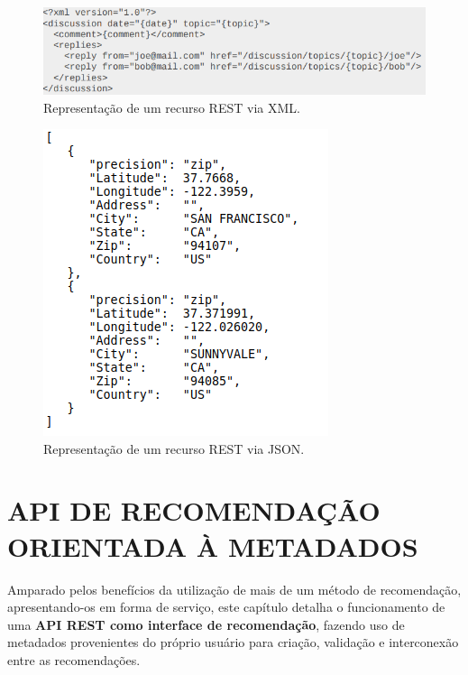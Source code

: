 \documentclass[12pt, openright, oneside, a4paper, brazil]{abntex2}
\begin{document}
\begin{figure}[htp]
	\caption{\label{xml_example}Representação de um recurso REST via XML.}
	\begin{center}
		\includegraphics[scale=0.9]{images/xml_example.png}
	\end{center}
\end{figure}

\begin{figure}[htp]
	\caption{\label{json}Representação de um recurso REST via JSON.}
	\begin{center}
		\includegraphics[scale=1]{images/json.png}
	\end{center}
\end{figure}

%
%

\chapter{API DE RECOMENDAÇÃO ORIENTADA À METADADOS}

Amparado pelos benefícios da utilização de mais de um método de recomendação, apresentando-os em forma de serviço, este capítulo detalha o funcionamento de uma \textbf{API REST como interface de recomendação}, fazendo uso de metadados provenientes do próprio usuário para criação, validação e interconexão entre as recomendações.
\end{document}
